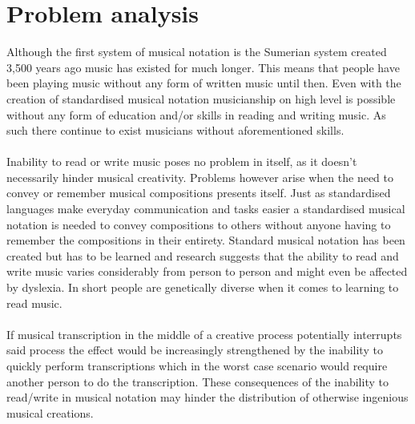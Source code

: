 \section{Problem analysis}
Although the first system of musical notation is the Sumerian system created 3,500 years ago music has existed for much longer. \cite{origins} This means that people have been playing music without any form of written music until then. Even with the creation of standardised musical notation musicianship on high level is possible without any form of education and/or skills in reading and writing music. As such there continue to exist musicians without aforementioned skills.\\\\
Inability to read or write music poses no problem in itself, as it doesn't necessarily hinder musical creativity. Problems however arise when the need to convey or remember musical compositions presents itself. Just as standardised languages make everyday communication and tasks easier a standardised musical notation is needed to convey compositions to others without anyone having to remember the compositions in their entirety. Standard musical notation has been created but has to be learned and research suggests that the ability to read and write music varies considerably from person to person and might even be affected by dyslexia. \cite{dyslexia} In short people are genetically diverse when it comes to learning to read music.\\\\
If musical transcription in the middle of a creative process potentially interrupts said process the effect would be increasingly strengthened by the inability to quickly perform transcriptions which in the worst case scenario would require another person to do the transcription. These consequences of the inability to read/write in musical notation may hinder the distribution of otherwise ingenious musical creations.
